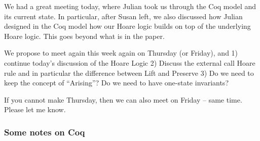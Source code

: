 \documentclass[acmsmall,review,anonymous]{acmart}\settopmatter{printfolios=true}
\begin{document}
 We had a great meeting today, where Julian took us through  the Coq model and its current state. In particular, after Susan left, we also discussed how Julian designed in the Coq model how our Hoare logic builds on top of the underlying Hoare logic. This goes beyond what is in the paper.
 
We propose to meet again this week again on Thursday (or Friday), and
1) continue today’s discussion of the Hoare Logic
2) Discuss the external call Hoare rule and in particular the difference between Lift and Preserve
3) Do we need to keep the concept of “Arising”? Do we need to have one-state invariants?
 
 
If you cannot make Thursday, then we can also meet on Friday – same time. Please let me know.
 
\subsubsection*{Some notes on Coq}
\end{document}
